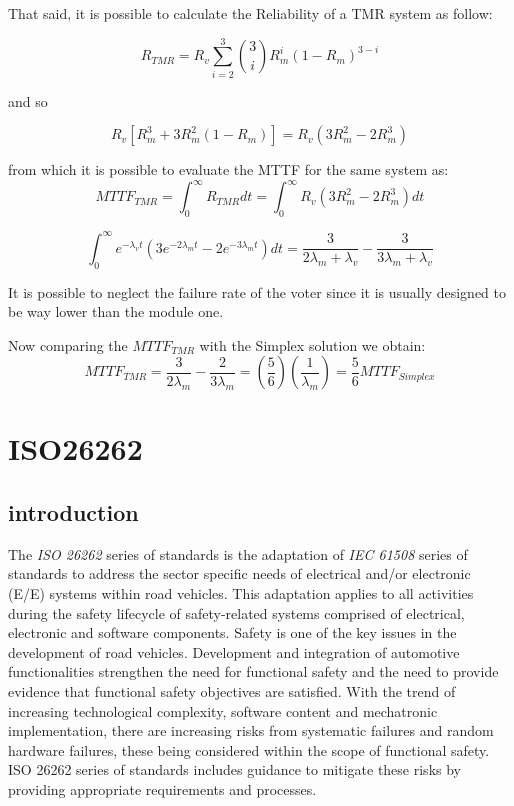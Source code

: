 \documentclass[./dissertation.tex]{subfiles}
\begin{document}
That said, it is possible to calculate the Reliability of a TMR system as follow:

\begin{equation}
    R_{TMR} = R_v \sum_{i=2}^{3} \binom{3}{i} R^i_m (1-R_m)^{3-i}
\end{equation}

and so 

\begin{equation}
    R_v [R_m^3 + 3R_m^2(1-R_m)] = R_v(3R^2_m - 2R_m^3)
\end{equation}

from which it is possible to evaluate the MTTF for the same system as:
\begin{equation}
MTTF_{TMR} = \int_0^{\infty}R_{TMR} dt = \int_0^{\infty}R_v (3R^2_m -2R^3_m)dt 
\end{equation}

\begin{equation}
\int_0^{\infty} e^{-\lambda_v t}\left( 3e^{-2\lambda_m t} -2e^{-3\lambda_m t}  \right) dt = \frac{3}{2\lambda_m + \lambda_v} - \frac{3}{3\lambda_m + \lambda_v}
\end{equation} 

It is possible to neglect the failure rate of the voter since it is usually designed to be way lower than the module one.

Now comparing the $MTTF_{TMR}$ with the Simplex solution we obtain:
\begin{equation}
    MTTF_{TMR} = \frac{3}{2\lambda_m} - \frac{2}{3\lambda_m} = \left( \frac{5}{6}\right) \left( \frac{1}{\lambda_m}\right) = \frac{5}{6} MTTF_{Simplex}
\end{equation}
\label{sec:iniziare}


\chapter{ISO26262}

\section{introduction}

The \textit{ISO 26262} series of standards is the adaptation of \textit{IEC 61508} series of standards to address the sector specific needs of electrical and/or electronic (E/E) systems within road vehicles. This adaptation applies to all activities during the safety lifecycle of safety-related systems comprised of electrical, electronic and software components. Safety is one of the key issues in the development of road vehicles. Development and integration of automotive functionalities strengthen the need for functional safety and the need to provide evidence that functional safety objectives are satisfied. With the trend of increasing technological complexity, software content and mechatronic implementation, there are increasing risks from systematic failures and random hardware failures, these being considered within the scope of functional safety. ISO 26262 series of standards includes guidance to mitigate these risks by providing appropriate requirements and processes.
\end{document}
